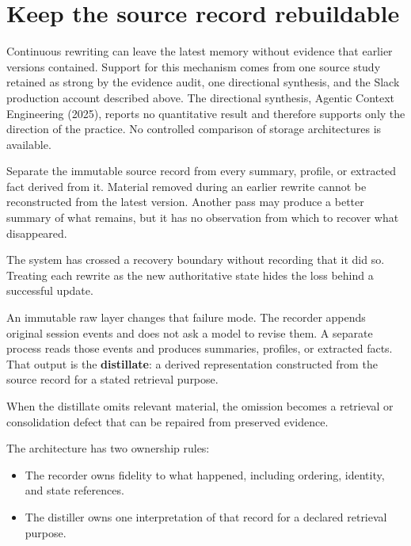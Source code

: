 \hypertarget{keep-the-source-record-rebuildable}{%
\section{Keep the source record rebuildable}\label{keep-the-source-record-rebuildable}}

Continuous rewriting can leave the latest memory without evidence that earlier versions contained. Support for this mechanism comes from one source study retained as strong by the evidence audit, one directional synthesis, and the Slack production account described above. The directional synthesis, Agentic Context Engineering (2025), reports no quantitative result and therefore supports only the direction of the practice. No controlled comparison of storage architectures is available.

Separate the immutable source record from every summary, profile, or extracted fact derived from it. Material removed during an earlier rewrite cannot be reconstructed from the latest version. Another pass may produce a better summary of what remains, but it has no observation from which to recover what disappeared.

The system has crossed a recovery boundary without recording that it did so. Treating each rewrite as the new authoritative state hides the loss behind a successful update.

An immutable raw layer changes that failure mode. The recorder appends original session events and does not ask a model to revise them. A separate process reads those events and produces summaries, profiles, or extracted facts. That output is the \textbf{distillate}: a derived representation constructed from the source record for a stated retrieval purpose.

When the distillate omits relevant material, the omission becomes a retrieval or consolidation defect that can be repaired from preserved evidence.


The architecture has two ownership rules:

\begin{itemize}
\tightlist
\item
  The recorder owns fidelity to what happened, including ordering, identity, and state references.
\item
  The distiller owns one interpretation of that record for a declared retrieval purpose.
\end{itemize}

